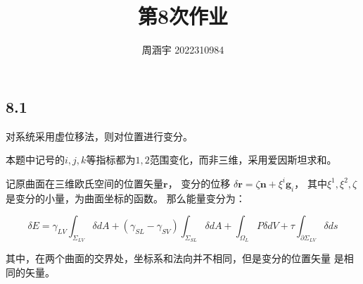 \documentclass[UTF8,zihao=5]{ctexart}
\title{{\bfseries 第8次作业}}
\author{周涵宇 2022310984}
\date{}
\begin{document}
\maketitle

\subsection*{8.1}

对系统采用虚位移法，则对位置进行变分。

本题中记号的$i,j,k$等指标都为$1,2$范围变化，而非三维，采用爱因斯坦求和。

记原曲面在三维欧氏空间的位置矢量$\bm{r}$，
变分的位移
$\delta\bm{r}=\zeta \bm{n} + \xi^i \bm{g}_i$，
其中$\xi^1,\xi^2,\zeta$是变分的小量，为曲面坐标的函数。
那么能量变分为：

$$
    \delta E
    =
    \gamma_{LV}\int_{\Sigma_{LV}}{\delta dA}
    +
    (\gamma_{SL}-\gamma_{SV})
    \int_{\Sigma_{SL}}{\delta dA}
    +
    \int_{\Omega_{L}}{P\delta dV}
    +
    \tau \int_{\partial\Sigma_{LV}}{\delta ds}
$$

其中，在两个曲面的交界处，坐标系和法向并不相同，但是变分的位置矢量
是相同的矢量。
\end{document}
